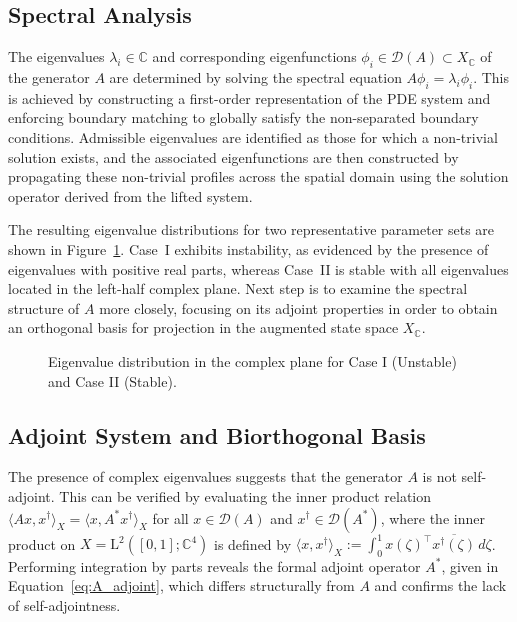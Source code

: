 \subsection{Spectral Analysis} \label{sec:3_2_spectral_analysis}

The eigenvalues $\lambda_i \in \mathbb{C}$ and corresponding eigenfunctions $\phi_i \in \mathcal{D}(A) \subset X_\mathbb{C}$ of the generator $A$ are determined by solving the spectral equation $A \phi_i = \lambda_i \phi_i$. This is achieved by constructing a first-order representation of the PDE system and enforcing boundary matching to globally satisfy the non-separated boundary conditions. Admissible eigenvalues are identified as those for which a non-trivial solution exists, and the associated eigenfunctions are then constructed by propagating these non-trivial profiles across the spatial domain using the solution operator derived from the lifted system.

The resulting eigenvalue distributions for two representative parameter sets are shown in Figure~\ref{fig:eigvals}. Case~I exhibits instability, as evidenced by the presence of eigenvalues with positive real parts, whereas Case~II is stable with all eigenvalues located in the left-half complex plane. Next step is to examine the spectral structure of $A$ more closely, focusing on its adjoint properties in order to obtain an orthogonal basis for projection in the augmented state space $X_\mathbb{C}$.

\begin{figure}[!htbp]
    \centering
    
    \caption{Eigenvalue distribution in the complex plane for Case I (Unstable) and Case II (Stable).}
    \label{fig:eigvals}
\end{figure}

\subsection{Adjoint System and Biorthogonal Basis} \label{sec:3_3_adjoint}

The presence of complex eigenvalues suggests that the generator $A$ is not self-adjoint. This can be verified by evaluating the inner product relation $\langle A x, x^\dagger \rangle_X = \langle x, A^* x^\dagger \rangle_X$ for all $x \in \mathcal{D}(A)$ and $x^\dagger \in \mathcal{D}(A^*)$, where the inner product on $X = \mathrm{L}^2([0,1]; \mathbb{C}^4)$ is defined by $\langle x, x^\dagger \rangle_X := \int_0^1 x(\zeta)^\top \overline{x^\dagger(\zeta)}\, d\zeta$. Performing integration by parts reveals the formal adjoint operator $A^*$, given in Equation~\eqref{eq:A_adjoint}, which differs structurally from $A$ and confirms the lack of self-adjointness.

